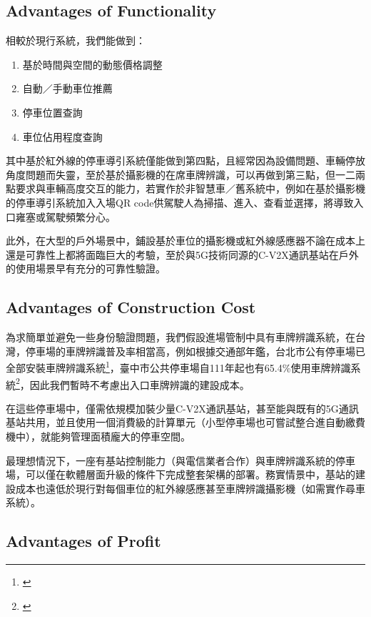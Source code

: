 \documentclass[sigconf,authorversion,nonacm,screen]{acmart}
\begin{document}
\subsection{Advantages of Functionality}

\quad 相較於現行系統，我們能做到：

\begin{enumerate}
    \item 基於時間與空間的動態價格調整
    \item 自動／手動車位推薦
    \item 停車位置查詢
    \item 車位佔用程度查詢
\end{enumerate}

其中基於紅外線的停車導引系統僅能做到第四點，且經常因為設備問題、車輛停放角度問題而失靈，至於基於攝影機的在席車牌辨識，可以再做到第三點，但一二兩點要求與車輛高度交互的能力，若實作於非智慧車／舊系統中，例如在基於攝影機的停車導引系統加入入場QR code供駕駛人為掃描、進入、查看並選擇，將導致入口雍塞或駕駛頻繁分心。

此外，在大型的戶外場景中，鋪設基於車位的攝影機或紅外線感應器不論在成本上還是可靠性上都將面臨巨大的考驗，至於與5G技術同源的C-V2X通訊基站在戶外的使用場景早有充分的可靠性驗證。

\subsection{Advantages of Construction Cost}

\quad 為求簡單並避免一些身份驗證問題，我們假設進場管制中具有車牌辨識系統，在台灣，停車場的車牌辨識普及率相當高，例如根據交通部年鑑，台北市公有停車場已全部安裝車牌辨識系統\footnote{\cite{motc111_taipei_parking}}，臺中市公共停車場自111年起也有65.4\%使用車牌辨識系統\footnote{\cite{motc111_taichung_parking}}，因此我們暫時不考慮出入口車牌辨識的建設成本。

在這些停車場中，僅需依規模加裝少量C-V2X通訊基站，甚至能與既有的5G通訊基站共用，並且使用一個消費級的計算單元（小型停車場也可嘗試整合進自動繳費機中），就能夠管理面積龐大的停車空間。

最理想情況下，一座有基站控制能力（與電信業者合作）與車牌辨識系統的停車場，可以僅在軟體層面升級的條件下完成整套架構的部署。務實情景中，基站的建設成本也遠低於現行對每個車位的紅外線感應甚至車牌辨識攝影機（如需實作尋車系統）。

\subsection{Advantages of Profit}
\end{document}

